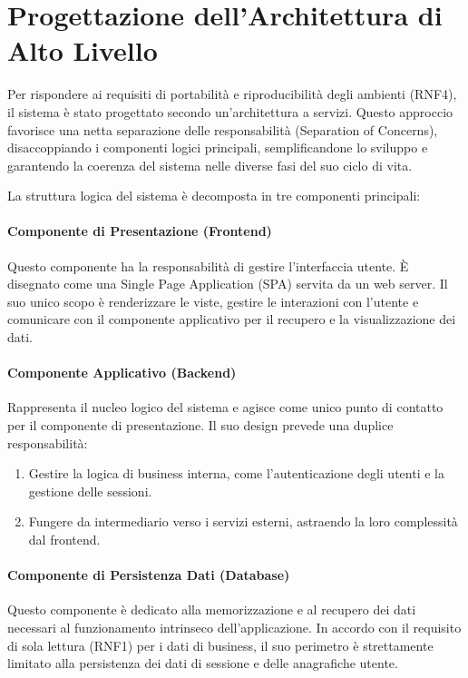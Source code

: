 \documentclass[12pt,a4paper,openright,twoside]{book}
\begin{document}
\section{Progettazione dell'Architettura di Alto Livello}
\label{sec:design_architettura}

Per rispondere ai requisiti di portabilità e riproducibilità degli ambienti (RNF4), il sistema è stato progettato secondo un'architettura a servizi. Questo approccio favorisce una netta separazione delle responsabilità (Separation of Concerns), disaccoppiando i componenti logici principali, semplificandone lo sviluppo e garantendo la coerenza del sistema nelle diverse fasi del suo ciclo di vita.

La struttura logica del sistema è decomposta in tre componenti principali:


    \paragraph{Componente di Presentazione (Frontend)} Questo componente ha la responsabilità di gestire l'interfaccia utente. È disegnato come una Single Page Application (SPA) servita da un web server. Il suo unico scopo è renderizzare le viste, gestire le interazioni con l'utente e comunicare con il componente applicativo per il recupero e la visualizzazione dei dati.

    \paragraph{Componente Applicativo (Backend)} Rappresenta il nucleo logico del sistema e agisce come unico punto di contatto per il componente di presentazione. Il suo design prevede una duplice responsabilità:
          \begin{enumerate}
              \item Gestire la logica di business interna, come l'autenticazione degli utenti e la gestione delle sessioni.
              \item Fungere da intermediario verso i servizi esterni, astraendo la loro complessità dal frontend.
          \end{enumerate}

    \paragraph{Componente di Persistenza Dati (Database)} Questo componente è dedicato alla memorizzazione e al recupero dei dati necessari al funzionamento intrinseco dell'applicazione. In accordo con il requisito di sola lettura (RNF1) per i dati di business, il suo perimetro è strettamente limitato alla persistenza dei dati di sessione e delle anagrafiche utente.
\end{document}
